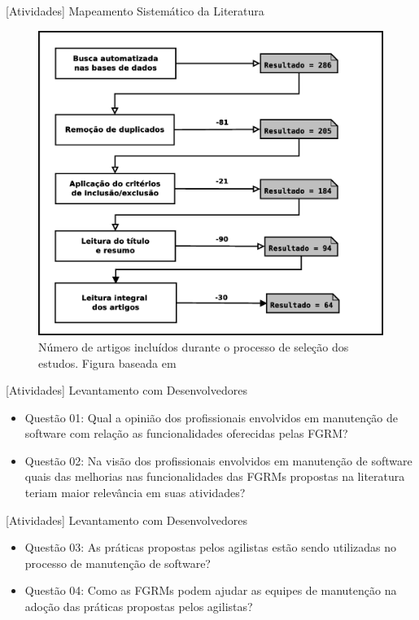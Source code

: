 \documentclass[t,14pt,mathserif]{beamer}
\begin{document}
\begin{frame}{[Atividades] Mapeamento Sistemático da Literatura}

            \begin{figure} \centering \includegraphics[width=0.45\linewidth]
        {../img/diagrama-processo-selecao.eps}
        \caption{Número de artigos incluídos durante o processo de seleção dos
            estudos. Figura baseada em~\cite{Petersen2015}}
\label{fig:diagrama-processo-selecao}

    \end{figure}
\end{frame}

\begin{frame}{[Atividades] Levantamento com Desenvolvedores}

    \begin{itemize}
        \item Questão 01: Qual a opinião dos profissionais envolvidos em
            manutenção de software com relação as funcionalidades
            oferecidas pelas FGRM\@?
        \item Questão 02: Na visão dos profissionais envolvidos em
            manutenção de software quais das melhorias nas
            funcionalidades das FGRMs propostas na literatura teriam
            maior relevância em suas atividades?
    \end{itemize}

\end{frame}

\begin{frame}{[Atividades] Levantamento com Desenvolvedores}

    \begin{itemize}
        \item Questão 03: As práticas propostas pelos agilistas estão
            sendo utilizadas no processo de manutenção de software?
        \item Questão 04: Como as FGRMs podem ajudar as equipes de
            manutenção na adoção das práticas propostas pelos agilistas?
    \end{itemize}

\end{frame}
\end{document}
